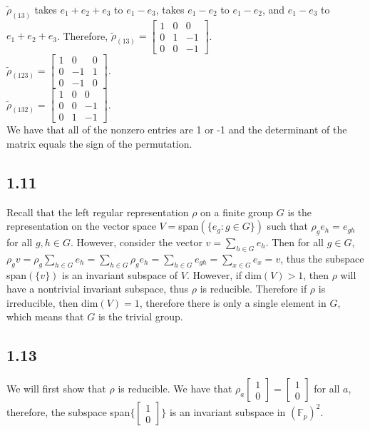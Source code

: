 \documentclass[]{article}
\begin{document}
$\tilde{\rho}_{(13)}$ takes $e_1 + e_2 + e_3$ to $e_1 - e_3$, takes $e_1 - e_2$ to $e_1 - e_2$, and $e_1 - e_3$ to $e_1 + e_2 + e_3$. Therefore, 
$\tilde{\rho}_{(13)} = 
\begin{bmatrix}
	1 & 0 & 0\\
	0 & 1 & -1\\
	0 & 0 & -1
\end{bmatrix}
$.
\\
$\tilde{\rho}_{(123)} = 
\begin{bmatrix}
	1 & 0 & 0\\
	0 & -1 & 1\\
	0 & -1 & 0
\end{bmatrix}
$.
\\
$\tilde{\rho}_{(132)} = 
\begin{bmatrix}
	1 & 0 & 0\\
	0 & 0 & -1\\
	0 & 1 & -1
\end{bmatrix}
$.
\\
We have that all of the nonzero entries are 1 or -1 and the determinant of the matrix equals the sign of the permutation.

\subsection*{1.11}
Recall that the left regular representation $\rho$ on a finite group $G$ is the representation on the vector space $V=$span$(\lbrace e_g : g \in G \rbrace)$ such that $\rho_g e_h = e_{gh}$ for all $g, h \in G$. However, consider the vector $v = \sum_{h \in G} e_h$. Then for all $g \in G$, $\rho_g v = \rho_g \sum_{h \in G} e_h = \sum_{h \in G} \rho_g e_h = \sum_{h \in G} e_{gh} = \sum_{x \in G} e_x = v$, thus the subspace span$(\lbrace v \rbrace)$ is an invariant subspace of $V$. However, if dim$(V) > 1$, then $\rho$ will have a nontrivial invariant subspace, thus $\rho$ is reducible. Therefore if $\rho$ is irreducible, then dim$(V) = 1$, therefore there is only a single element in $G$, which means that $G$ is the trivial group.
\subsection*{1.13}
We will first show that $\rho$ is reducible. We have that $\rho_a \begin{bmatrix}
	1\\
	0
\end{bmatrix}
= \begin{bmatrix}
	1\\
	0
\end{bmatrix}
$ for all $a$, therefore, the subspace span$\lbrace \begin{bmatrix}
	1\\
	0
\end{bmatrix} \rbrace$ is an invariant subspace in $(\mathbb{F}_p)^2$. 
\end{document}
